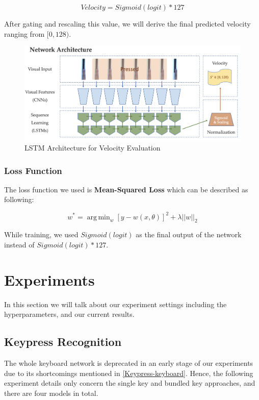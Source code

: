 \documentclass[10pt,twocolumn,letterpaper]{article}
\DeclareMathOperator*{\argmin}{arg\,min}
\begin{document}
   \[Velocity = Sigmoid(logit) * 127\]
   
After gating and rescaling this value, we will derive the final predicted velocity ranging from \([0, 128)\).

   \begin{figure}[h!]
      \centering
      \includegraphics[width=\linewidth]{fig/13.png}
      \caption{LSTM Architecture for Velocity Evaluation} \label{fig:5}
   \end{figure}

   \subsubsection{Loss Function}

   The loss function we used is \textbf{Mean-Squared Loss} which can be described as following:

   \[w^*=\argmin_w[y - w(x, \theta)]^2+\lambda||w||_2\]

   While training, we used \(Sigmoid(logit)\) as the final output of the network instead of \(Sigmoid(logit) * 127\).

\section{Experiments}

In this section we will talk about our experiment settings including the hyperparameters, and our current results.

\subsection{Keypress Recognition}

The whole keyboard network is deprecated in an early stage of our experiments due to its shortcomings mentioned in \ref{Keypress-keyboard}. 
Hence, the following experiment details only concern the single key and bundled key approaches, and there are four models in total.
\end{document}
